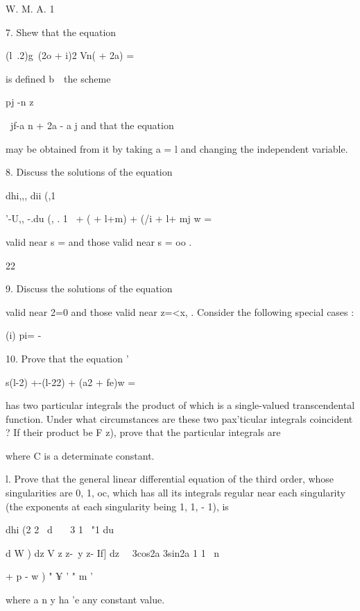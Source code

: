 W. M. A. 1

%
%

7. Shew that the equation

(l\ .2)g\ (2o + i)2 Vn( + 2a) =

is defined b\ \ the scheme

pj -n z

\ jf-a n + 2a - a j and that the equation

may be obtained from it by taking a = l and changing the independent
variable.

8. Discuss the solutions of the equation

dhi,,, dii (,1


'-U,, -.du (, . 1 \ + ( + l+m) + (/i + l+ mj w =

valid near s = and those valid near s = oo . 

 22

9. Discuss the solutions of the equation

valid near 2=0 and those valid near z=<x, . Consider the following
special cases :

(i) pi= -%

10. Prove that the equation '

s(l-2) +-(l-22) + (a2 + fe)w =

has two particular integrals the product of which is a single-valued
transcendental function. Under what circumstances are these two
pax'ticular integrals coincident ? If their product be F z), prove
that the particular integrals are

where C is a determinate constant.

l. Prove that the general linear differential equation of the third
order, whose singularities are 0, 1, oc, which has all its integrals
regular near each singularity (the exponents at each singularity being
1, 1, - 1), is

dhi (2 2 \ d \ \ \ 3 1 \ "1 du

d W ) dz V z z-\ y z- If] dz \ \ 3cos2a 3sin2a 1 1 \ n

+ p - w ) " ¥ ' " m '

where a n y ha 'e any constant value. 
